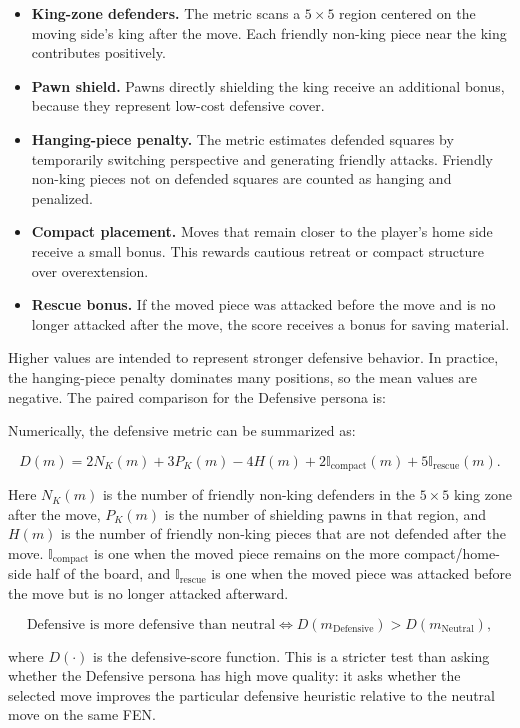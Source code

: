 \documentclass[10pt]{article}
\begin{document}
\begin{itemize}
    \item \textbf{King-zone defenders.} The metric scans a $5 \times 5$ region centered on the moving side's king after the move. Each friendly non-king piece near the king contributes positively.
    \item \textbf{Pawn shield.} Pawns directly shielding the king receive an additional bonus, because they represent low-cost defensive cover.
    \item \textbf{Hanging-piece penalty.} The metric estimates defended squares by temporarily switching perspective and generating friendly attacks. Friendly non-king pieces not on defended squares are counted as hanging and penalized.
    \item \textbf{Compact placement.} Moves that remain closer to the player's home side receive a small bonus. This rewards cautious retreat or compact structure over overextension.
    \item \textbf{Rescue bonus.} If the moved piece was attacked before the move and is no longer attacked after the move, the score receives a bonus for saving material.
\end{itemize}

Higher values are intended to represent stronger defensive behavior. In practice, the hanging-piece penalty dominates many positions, so the mean values are negative. The paired comparison for the Defensive persona is:

Numerically, the defensive metric can be summarized as:

\[
D(m) = 2N_K(m) + 3P_K(m) - 4H(m) + 2\mathbb{I}_{\text{compact}}(m) + 5\mathbb{I}_{\text{rescue}}(m).
\]

Here $N_K(m)$ is the number of friendly non-king defenders in the $5 \times 5$ king zone after the move, $P_K(m)$ is the number of shielding pawns in that region, and $H(m)$ is the number of friendly non-king pieces that are not defended after the move. $\mathbb{I}_{\text{compact}}$ is one when the moved piece remains on the more compact/home-side half of the board, and $\mathbb{I}_{\text{rescue}}$ is one when the moved piece was attacked before the move but is no longer attacked afterward.

\[
\text{Defensive is more defensive than neutral} \iff
D(m_{\text{Defensive}}) > D(m_{\text{Neutral}}),
\]

where $D(\cdot)$ is the defensive-score function. This is a stricter test than asking whether the Defensive persona has high move quality: it asks whether the selected move improves the particular defensive heuristic relative to the neutral move on the same FEN.
\end{document}
